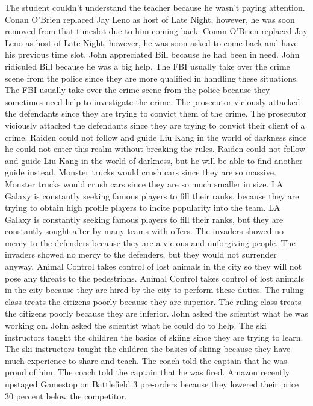 \documentclass{article}
\begin{document}
\begin{enumerate}
	The student couldn't understand the teacher because he wasn't paying attention.
	Conan O'Brien replaced Jay Leno as host of Late Night, however, he was soon removed from that timeslot due to him coming back.
	Conan O'Brien replaced Jay Leno as host of Late Night, however, he was soon asked to come back and have his previous time slot.
	John appreciated Bill because he had been in need.
	John ridiculed Bill because he was a big help.
	The FBI usually take over the crime scene from the police since they are more qualified in handling these situations.
	The FBI usually take over the crime scene from the police because they sometimes need help to investigate the crime.
	The prosecutor viciously attacked the defendants since they are trying to convict them of the crime.
	The prosecutor viciously attacked the defendants since they are trying to convict their client of a crime.
	Raiden could not follow and guide Liu Kang in the world of darkness since he could not enter this realm without breaking the rules.
	Raiden could not follow and guide Liu Kang in the world of darkness, but he will be able to find another guide instead.
	Monster trucks would crush cars since they are so massive.
	Monster trucks would crush cars since they are so much smaller in size.
	LA Galaxy is constantly seeking famous players to fill their ranks, because they are trying to obtain high profile players to incite popularity into the team.
	LA Galaxy is constantly seeking famous players to fill their ranks, but they are constantly sought after by many teams with offers.
	The invaders showed no mercy to the defenders because they are a vicious and unforgiving people.
	The invaders showed no mercy to the defenders, but they would not surrender anyway.
	Animal Control takes control of lost animals in the city so they will not pose any threats to the pedestrians.
	Animal Control takes control of lost animals in the city because they are hired by the city to perform these duties.
	The ruling class treats the citizens poorly because they are superior.
	The ruling class treats the citizens poorly because they are inferior.
	John asked the scientist what he was working on.
	John asked the scientist what he could do to help.
	The ski instructors taught the children the basics of skiing since they are trying to learn.
	The ski instructors taught the children the basics of skiing because they have much experience to share and teach.
	The coach told the captain that he was proud of him.
	The coach told the captain that he was fired.
	Amazon recently upstaged Gamestop on Battlefield 3 pre-orders because they lowered their price 30 percent below the competitor.

\end{enumerate}
\end{document}
